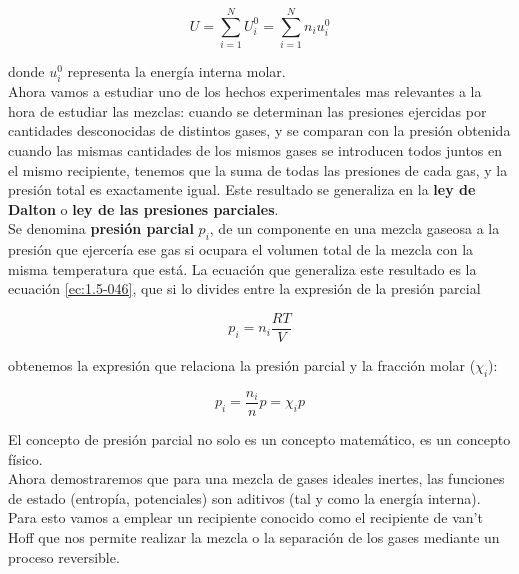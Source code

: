 \documentclass[12pt,a4paper]{article}
\begin{document}
\begin{equation}
U = \sum_{i=1}^N U_i^0 = \sum_{i=1}^N n_i u_i^0
\end{equation}

donde $u_i^0$ representa la energía interna molar. \\

Ahora vamos a estudiar uno de los hechos experimentales mas relevantes a la hora de estudiar las mezclas: cuando se determinan las presiones ejercidas por cantidades desconocidas de distintos gases, y se comparan con la presión obtenida cuando las mismas cantidades de los mismos gases se introducen todos juntos en el mismo recipiente, tenemos que la suma de todas las presiones de cada gas, y la presión total es exactamente igual. Este resultado se generaliza en la \textbf{ley de Dalton} o \textbf{ley de las presiones parciales}. \\

Se denomina \textbf{presión parcial} $p_i$, de un componente en una mezcla gaseosa a la presión que ejercería ese gas si ocupara el volumen total de la mezcla con la misma temperatura que está. La ecuación que generaliza este resultado es la ecuación \ref{ec:1.5-046}, que si lo divides entre la expresión de la presión parcial


\begin{equation}
p_i = n_i \dfrac{RT}{V}
\end{equation}

obtenemos la expresión que relaciona la presión parcial y la fracción molar ($\chi_i$): 

\begin{equation}
p_i = \dfrac{n_i}{n} p = \chi_i p
\end{equation}

El concepto de presión parcial no solo es un concepto matemático, es un concepto físico. \\

Ahora demostraremos que para una mezcla de gases ideales inertes, las funciones de estado (entropía, potenciales) son aditivos (tal y como la energía interna). Para esto vamos a emplear un recipiente conocido como el recipiente de van't Hoff que nos permite realizar la mezcla o la separación de los gases mediante un proceso reversible. \\
\end{document}
